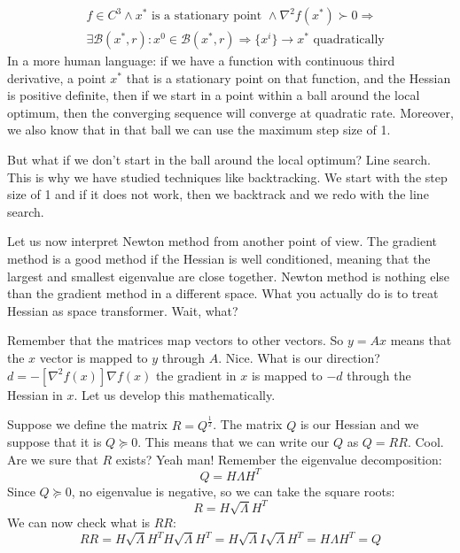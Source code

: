 \begin{align}
    &f \in C^3 \wedge x^* \mbox{ is a stationary point } \wedge \nabla^2 f(x^*) \succ 0 \Rightarrow\\
    &\exists \mathcal{B}(x^*,r) : x^0 \in \mathcal{B}(x^*, r) \Rightarrow \{x^i\} \rightarrow x^* \mbox{ quadratically}
\end{align}
In a more human language: if we have a function with continuous third derivative, a point $x^*$ that is a stationary point on that function, and the Hessian is positive definite, then if we start in a point within a ball around the local optimum, then the converging sequence will converge at quadratic rate. Moreover, we also know that in that ball we can use the maximum step size of 1.
\par But what if we don't start in the ball around the local optimum? Line search. This is why we have studied techniques like backtracking. We start with the step size of 1 and if it does not work, then we backtrack and we redo with the line search.
\par Let us now interpret Newton method from another point of view. The gradient method is a good method if the Hessian is well conditioned, meaning that the largest and smallest eigenvalue are close together. Newton method is nothing else than the gradient method in a different space. What you actually do is to treat Hessian as space transformer. Wait, what?
\par Remember that the matrices map vectors to other vectors. So $y = Ax$ means that the $x$ vector is mapped to $y$ through $A$. Nice. What is our direction? $d = - [\nabla^2 f(x)] \nabla f(x)$ the gradient in $x$ is mapped to $-d$ through the Hessian in $x$. Let us develop this mathematically.
\par Suppose we define the matrix $R = Q^{\frac{1}{2}}$. The matrix $Q$ is our Hessian and we suppose that it is $Q \succeq 0$. This means that we can write our $Q$ as $Q = RR$. Cool. Are we sure that $R$ exists? Yeah man! Remember the eigenvalue decomposition:
\begin{equation}
    Q = H \Lambda H^T
\end{equation}
Since $Q \succeq 0$, no eigenvalue is negative, so we can take the square roots:
\begin{equation}
    R = H \sqrt{\Lambda} H^T
\end{equation}
We can now check what is $RR$:
\begin{equation}
    RR = H \sqrt{\Lambda} H^T H \sqrt{\Lambda} H^T = H \sqrt{\Lambda} I \sqrt{\Lambda} H^T = H \Lambda H^T = Q
\end{equation}
